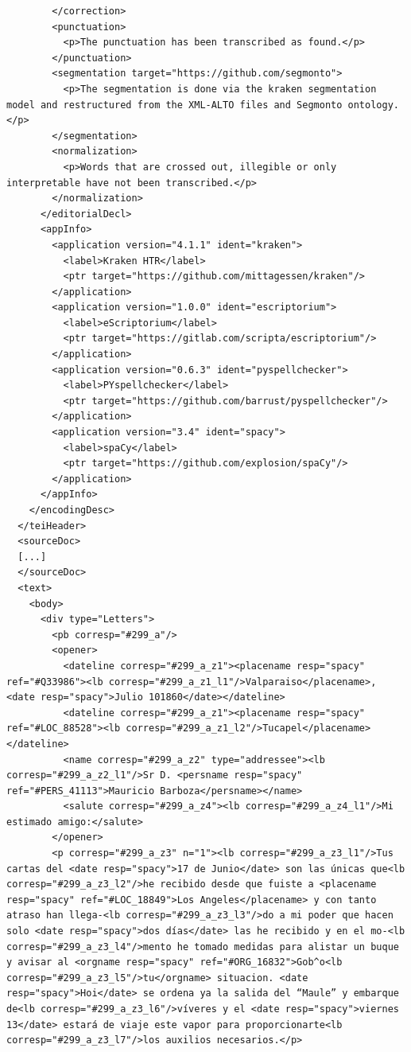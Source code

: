 \begin{verbatim}
        </correction>
        <punctuation>
          <p>The punctuation has been transcribed as found.</p>
        </punctuation>
        <segmentation target="https://github.com/segmonto">
          <p>The segmentation is done via the kraken segmentation model and restructured from the XML-ALTO files and Segmonto ontology.</p>
        </segmentation>
        <normalization>
          <p>Words that are crossed out, illegible or only interpretable have not been transcribed.</p>
        </normalization>
      </editorialDecl>
      <appInfo>
        <application version="4.1.1" ident="kraken">
          <label>Kraken HTR</label>
          <ptr target="https://github.com/mittagessen/kraken"/>
        </application>
        <application version="1.0.0" ident="escriptorium">
          <label>eScriptorium</label>
          <ptr target="https://gitlab.com/scripta/escriptorium"/>
        </application>
        <application version="0.6.3" ident="pyspellchecker">
          <label>PYspellchecker</label>
          <ptr target="https://github.com/barrust/pyspellchecker"/>
        </application>
        <application version="3.4" ident="spacy">
          <label>spaCy</label>
          <ptr target="https://github.com/explosion/spaCy"/>
        </application>
      </appInfo>
    </encodingDesc>
  </teiHeader>
  <sourceDoc>
  [...]
  </sourceDoc>
  <text>
    <body>
      <div type="Letters">
        <pb corresp="#299_a"/>
        <opener>
          <dateline corresp="#299_a_z1"><placename resp="spacy" ref="#Q33986"><lb corresp="#299_a_z1_l1"/>Valparaiso</placename>, <date resp="spacy">Julio 101860</date></dateline>
          <dateline corresp="#299_a_z1"><placename resp="spacy" ref="#LOC_88528"><lb corresp="#299_a_z1_l2"/>Tucapel</placename></dateline>
          <name corresp="#299_a_z2" type="addressee"><lb corresp="#299_a_z2_l1"/>Sr D. <persname resp="spacy" ref="#PERS_41113">Mauricio Barboza</persname></name>
          <salute corresp="#299_a_z4"><lb corresp="#299_a_z4_l1"/>Mi estimado amigo:</salute>
        </opener>
        <p corresp="#299_a_z3" n="1"><lb corresp="#299_a_z3_l1"/>Tus cartas del <date resp="spacy">17 de Junio</date> son las únicas que<lb corresp="#299_a_z3_l2"/>he recibido desde que fuiste a <placename resp="spacy" ref="#LOC_18849">Los Angeles</placename> y con tanto atraso han llega-<lb corresp="#299_a_z3_l3"/>do a mi poder que hacen solo <date resp="spacy">dos días</date> las he recibido y en el mo-<lb corresp="#299_a_z3_l4"/>mento he tomado medidas para alistar un buque y avisar al <orgname resp="spacy" ref="#ORG_16832">Gob^o<lb corresp="#299_a_z3_l5"/>tu</orgname> situacion. <date resp="spacy">Hoi</date> se ordena ya la salida del “Maule” y embarque de<lb corresp="#299_a_z3_l6"/>víveres y el <date resp="spacy">viernes 13</date> estará de viaje este vapor para proporcionarte<lb corresp="#299_a_z3_l7"/>los auxilios necesarios.</p>

\end{verbatim}
